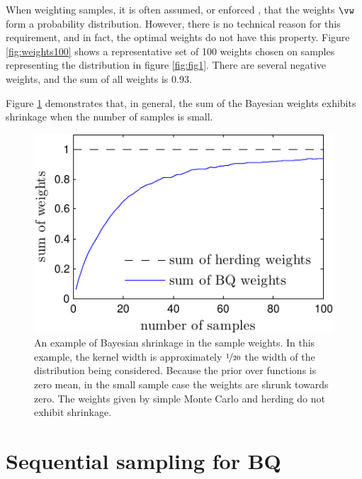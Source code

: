When weighting samples, it is often assumed, or enforced \citep[as in][]{bach2012equivalence,Song2008}, that the weights $\vw$ form a probability distribution. However, there is no technical reason for this requirement, and in fact, the optimal weights do not have this property. Figure \ref{fig:weights100} shows a representative set of 100 \bq{} weights chosen on samples representing the distribution in figure \ref{fig:fig1}. There are several negative weights, and the sum of all weights is 0.93.

Figure \ref{fig:weights_shrinkage} demonstrates that, in general, the sum of the Bayesian weights exhibits shrinkage when the number of samples is small.

\begin{figure}
	\centering
	\includegraphics[width=\columnwidth]{figs/herding/weights_shrinkage}
	
		\caption[The concept of shrinkage in Bayesian quadrature]{An example of Bayesian shrinkage in the sample weights. In this example, the kernel width is approximately $\nicefrac{1}{20}$ the width of the distribution being considered. Because the prior over functions is zero mean, in the small sample case the weights are shrunk towards zero. The weights given by simple Monte Carlo and herding do not exhibit shrinkage. }
	\label{fig:weights_shrinkage}
\end{figure}

\section{Sequential sampling for BQ}

